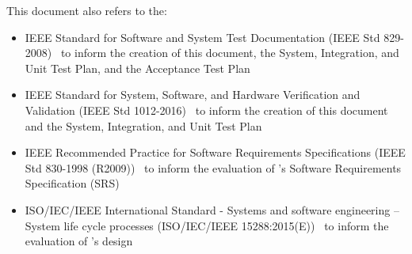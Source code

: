 \noindent This document also refers to the:
\begin{itemize}

    \item IEEE Standard for Software and System Test Documentation (IEEE
    Std 829-2008)~\citep{vvDocIEEE} to inform the creation of this document,
    the System, Integration, and Unit Test Plan, and the Acceptance Test Plan

    \item IEEE Standard for System, Software, and Hardware Verification and
    Validation (IEEE Std 1012-2016)~\citep{vvIEEE} to inform the creation of
    this document and the System, Integration, and Unit Test Plan

    \item IEEE Recommended Practice for Software Requirements Specifications
    (IEEE Std 830-1998 (R2009))~\citep{srsIEEE} to inform the evaluation of
    \progname{}'s Software Requirements Specification (SRS)

    \item ISO/IEC/IEEE International Standard - Systems and software
    engineering -- System life cycle processes (ISO/IEC/IEEE
    15288:2015(E))~\citep{slcIEEE} to inform the evaluation of \progname{}'s
    design

\end{itemize}